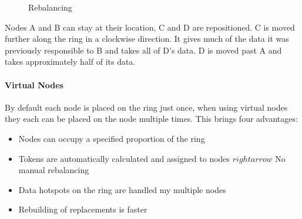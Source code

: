 \begin{figure}[ht]
  \centering
  \caption{Rebalancing}
  \label{fig:cassandra:rebalancing}
\end{figure}

Nodes A and B can stay at their location, C and D are repositioned. C is moved further along the ring in a clockwise direction. It gives much of the data it was previously responsible to B and takes all of D's data. D is moved past A and takes approximately half of its data.

\paragraph{Virtual Nodes}

By default each node is placed on the ring just once, when using virtual nodes they each can be placed on the node multiple times. This brings four advantages:

\begin{itemize}
  \item Nodes can occupy a specified proportion of the ring
  \item Tokens are automatically calculated and assigned to nodes $rightarrow$ No manual rebalancing
  \item Data hotspots on the ring are handled my multiple nodes
  \item Rebuilding of replacements is faster
\end{itemize}

